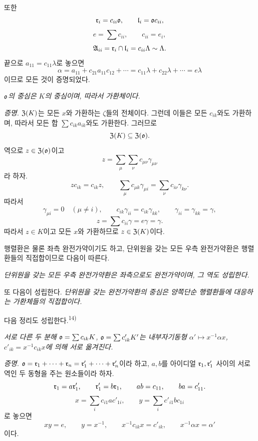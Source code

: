 또한
\[
        \mathfrak r_i=c_{ii}\mathfrak o,
        \qquad
        \mathfrak l_i=\mathfrak o c_{ii},
\]
\[
        e=\sum c_{ii},
        \qquad c_{ii}=e_i,
\]
\[
        \mathfrak A_{ii}=\mathfrak r_i\cap\mathfrak l_i=c_{ii}\Lambda\sim\Lambda.
\]
끝으로 \(a_{11}=c_{11}\lambda\)로 놓으면
\[
        \alpha=a_{11}+c_{21}a_{11}c_{12}+\cdots
        =c_{11}\lambda+c_{22}\lambda+\cdots=e\lambda
\]
이므로 모든 것이 증명되었다.

\emph{\(\mathfrak o\)의 중심은 \(K\)의 중심이며, 따라서 가환체이다.}

\emph{증명.} \(\mathfrak Z(K)\)는 모든 \(x\)와 가환하는 \(\zeta\)들의 전체이다. 그런데 이들은 모든 \(c_{ik}\)와도 가환하며, 따라서 모든 합 \(\sum c_{ik}a_{ik}\)와도 가환한다. 그러므로
\[
        \mathfrak Z(K)\subseteq\mathfrak Z(\mathfrak o).
\]
역으로 \(z\in\mathfrak Z(\mathfrak o)\)이고
\[
        z=\sum_\mu\sum_\nu c_{\mu\nu}\gamma_{\mu\nu}
\]
라 하자.
\[
        zc_{ik}=c_{ik}z,
        \qquad
        \sum_\mu c_{\mu k}\gamma_{\mu i}
        =\sum_\nu c_{i\nu}\gamma_{k\nu}.
\]
따라서
\[
        \gamma_{\mu i}=0\quad(\mu\ne i),
        \qquad
        c_{ik}\gamma_{ii}=c_{ik}\gamma_{kk},
        \qquad
        \gamma_{ii}=\gamma_{kk}=\gamma,
\]
\[
        z=\sum c_{ii}\gamma=e\gamma=\gamma.
\]
따라서 \(z\in K\)이고 모든 \(x\)와 가환하므로 \(z\in\mathfrak Z(K)\)이다.

행렬환은 물론 좌측 완전가약이기도 하고, 단위원을 갖는 모든 우측 완전가약환은 행렬환들의 직접합이므로 다음이 따른다.

\emph{단위원을 갖는 모든 우측 완전가약환은 좌측으로도 완전가약이며, 그 역도 성립한다.}

또 다음이 성립한다. \emph{단위원을 갖는 완전가약환의 중심은 양쪽단순 행렬환들에 대응하는 가환체들의 직접합이다.}

다음 정리도 성립한다.\textsuperscript{14)}

\emph{서로 다른 두 분해 \(\mathfrak o=\sum c_{ik}K\), \(\mathfrak o=\sum c'_{ik}K'\)는 내부자기동형 \(\alpha'\mapsto x^{-1}\alpha x\), \(c'_{ik}=x^{-1}c_{ik}x\)에 의해 서로 옮겨진다.}

\emph{증명.} \(\mathfrak o=\mathfrak r_1+\cdots+\mathfrak r_n=\mathfrak r_1'+\cdots+\mathfrak r_n'\)이라 하고, \(a,b\)를 아이디얼 \(\mathfrak r_1,\mathfrak r_1'\) 사이의 서로 역인 두 동형을 주는 원소들이라 하자.
\[
        \mathfrak r_1=a\mathfrak r_1',
        \qquad
        \mathfrak r_1'=b\mathfrak r_1,
        \qquad
        ab=c_{11},
        \qquad
        ba=c'_{11}.
\]
\[
        x=\sum_i c_{i1}ac'_{1i},
        \qquad
        y=\sum_i c'_{i1}bc_{1i}
\]
로 놓으면
\[
        xy=e,
        \qquad
        y=x^{-1},
        \qquad
        x^{-1}c_{ik}x=c'_{ik},
        \qquad
        x^{-1}\alpha x=\alpha'
\]
이다.

